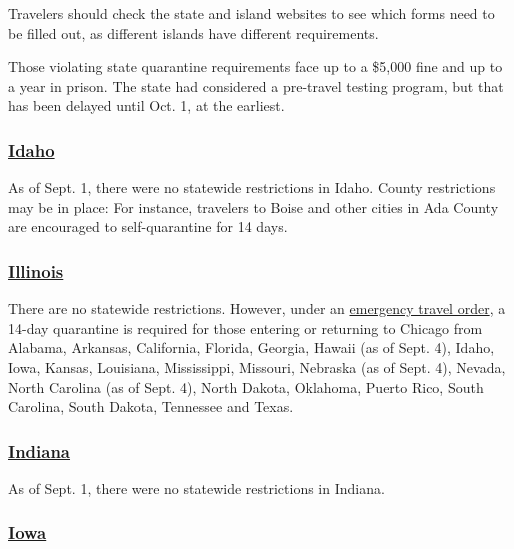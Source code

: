 Travelers should check the state and island websites to see which forms
need to be filled out, as different islands have different requirements.

Those violating state quarantine requirements face up to a \$5,000 fine
and up to a year in prison. The state had considered a pre-travel
testing program, but that has been delayed until Oct. 1, at the
earliest.

\hypertarget{idaho}{%
\subsubsection{\texorpdfstring{\href{https://visitidaho.org/covid-19-travel-alert/}{Idaho}}{Idaho}}\label{idaho}}

As of Sept. 1, there were no statewide restrictions in Idaho. County
restrictions may be in place: For instance, travelers to Boise and other
cities in Ada County are encouraged to self-quarantine for 14 days.

\hypertarget{illinois}{%
\subsubsection{\texorpdfstring{\href{https://www.dph.illinois.gov/topics-services/diseases-and-conditions/diseases-a-z-list/coronavirus/travel-guidance}{Illinois}}{Illinois}}\label{illinois}}

There are no statewide restrictions. However, under an
\href{https://www.chicago.gov/city/en/sites/covid-19/home/emergency-travel-order.html}{emergency
travel order}, a 14-day quarantine is required for those entering or
returning to Chicago from Alabama, Arkansas, California, Florida,
Georgia, Hawaii (as of Sept. 4), Idaho, Iowa, Kansas, Louisiana,
Mississippi, Missouri, Nebraska (as of Sept. 4), Nevada, North Carolina
(as of Sept. 4), North Dakota, Oklahoma, Puerto Rico, South Carolina,
South Dakota, Tennessee and Texas.

\hypertarget{indiana}{%
\subsubsection{\texorpdfstring{\href{https://www.coronavirus.in.gov}{Indiana}}{Indiana}}\label{indiana}}

As of Sept. 1, there were no statewide restrictions in Indiana.

\hypertarget{iowa}{%
\subsubsection{\texorpdfstring{\href{https://www.traveliowa.com/aspx/general/dynamicpage.aspx?id=204}{Iowa}}{Iowa}}\label{iowa}}

